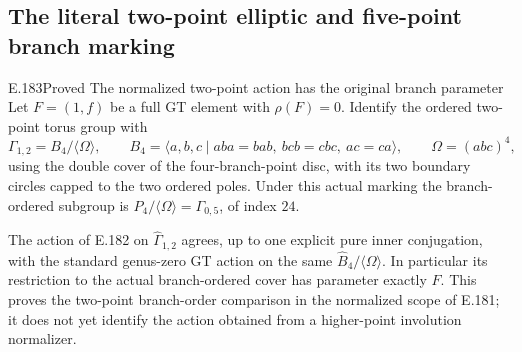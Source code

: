 \subsection{The literal two-point elliptic and five-point branch marking}

\begin{result}{E.183}{Proved}
{The normalized two-point action has the original branch parameter}
Let \(F=(1,f)\) be a full GT element with \(\rho(F)=0\).
Identify the ordered two-point torus group with
\[
 \Gamma_{1,2}=B_4/\langle\Omega\rangle,\qquad
 B_4=\langle a,b,c\mid aba=bab,\ bcb=cbc,\ ac=ca\rangle,
 \qquad\Omega=(abc)^4,
\tag{E.183.1}
\]
using the double cover of the four-branch-point disc, with
its two boundary circles capped to the two ordered poles.
Under this actual marking the branch-ordered subgroup is
\(P_4/\langle\Omega\rangle=\Gamma_{0,5}\), of index \(24\).

The action of E.182 on \(\widehat\Gamma_{1,2}\) agrees,
up to one explicit pure inner conjugation, with the standard
genus-zero GT action on the same \(\widehat B_4/\langle\Omega\rangle\).
In particular its restriction to the actual branch-ordered
cover has parameter exactly \(F\).
This proves the two-point branch-order comparison in the
normalized scope of E.181; it does not yet identify the
action obtained from a higher-point involution normalizer.
\end{result}

